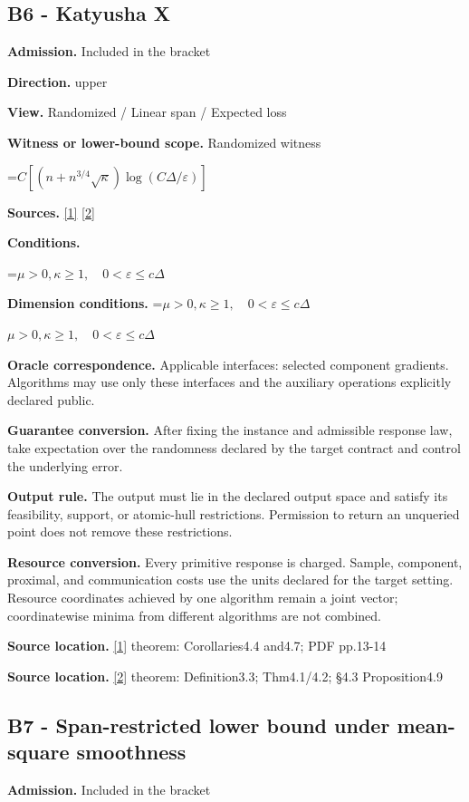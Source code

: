 \documentclass[10pt,a4paper]{article}
\newcommand{\AtlasMath}[1]{\par\begingroup\centering\setbox0=\hbox{$\displaystyle #1$}\ifdim\wd0>1.4\linewidth\typeout{ATLAS WIDE FORMULA: \the\wd0}\fi\ifdim\wd0>\linewidth\resizebox{\linewidth}{!}{\box0}\else\box0\fi\par\endgroup}
\newcommand{\AtlasInlineMath}[1]{\begingroup\setbox0=\hbox{$#1$}\ifdim\wd0>.4\linewidth\endgroup\AtlasMath{#1}\else\endgroup$#1$\fi}
\begin{document}
\subsection{B6 - Katyusha X}
\textbf{Admission.} Included in the bracket

\textbf{Direction.} upper

\textbf{View.} Randomized / Linear span / Expected loss

\textbf{Witness or lower-bound scope.} Randomized witness

\AtlasMath{C[(n+n^{3/4}\sqrt\kappa)\log(C\Delta/\varepsilon)]}
\textbf{Sources.} \href{https://arxiv.org/pdf/1802.03866}{[1]} \href{https://proceedings.mlr.press/v97/zhou19b/zhou19b.pdf}{[2]}

\textbf{Conditions.} 
\AtlasMath{\mu>0,\kappa\ge1,\quad0<\varepsilon\le c\Delta}


\textbf{Dimension conditions.} \AtlasInlineMath{\mu>0,\kappa\ge1,\quad0<\varepsilon\le c\Delta}

\textbf{Oracle correspondence.} Applicable interfaces: selected component gradients. Algorithms may use only these interfaces and the auxiliary operations explicitly declared public.

\textbf{Guarantee conversion.} After fixing the instance and admissible response law, take expectation over the randomness declared by the target contract and control the underlying error.

\textbf{Output rule.} The output must lie in the declared output space and satisfy its feasibility, support, or atomic-hull restrictions. Permission to return an unqueried point does not remove these restrictions.

\textbf{Resource conversion.} Every primitive response is charged. Sample, component, proximal, and communication costs use the units declared for the target setting. Resource coordinates achieved by one algorithm remain a joint vector; coordinatewise minima from different algorithms are not combined.

\textbf{Source location.} \href{https://arxiv.org/pdf/1802.03866}{[1]} theorem: Corollaries4.4 and4.7; PDF pp.13-14

\textbf{Source location.} \href{https://proceedings.mlr.press/v97/zhou19b/zhou19b.pdf}{[2]} theorem: Definition3.3; Thm4.1/4.2; §4.3 Proposition4.9

\subsection{B7 - Span-restricted lower bound under mean-square smoothness}
\textbf{Admission.} Included in the bracket
\end{document}
